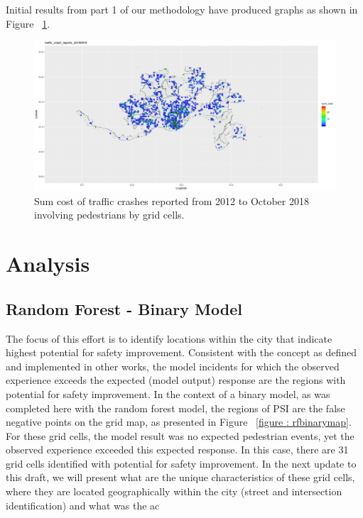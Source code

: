 \documentclass{llncs}
\begin{document}
Initial results from part 1 of our methodology have produced graphs as shown in Figure ~\ref{figure:SumCrashPlot}. \newline
\FloatBarrier
\begin{figure}
 	\includegraphics[width=\textwidth, height=\textheight, keepaspectratio]{TrafficCrashReports20180918SumCostMapped2Grid.png}
 	\caption{Sum cost of traffic crashes reported from 2012 to October 2018 involving pedestrians by grid cells.}
	\label{figure:SumCrashPlot}
\end{figure}
\FloatBarrier
%
\section{Analysis}
%
\subsection{Random Forest - Binary Model}

The focus of this effort is to identify locations within the city that indicate highest potential for safety improvement. Consistent with the concept as defined and implemented in other works, the model incidents for which the observed experience exceeds the expected (model output) response are the regions with potential for safety improvement. In the context of a binary model, as was completed here with the random forest model, the regions of PSI are the false negative points on the grid map, as presented in Figure ~\ref{figure : rfbinarymap}. For these grid cells, the model result was no expected pedestrian events, yet the observed experience exceeded this expected response. In this case, there are 31 grid cells identified with potential for safety improvement. In the next update to this draft, we will present what are the unique characteristics of these grid cells, where they are located geographically within the city (street and intersection identification) and what was the ac
\end{document}
